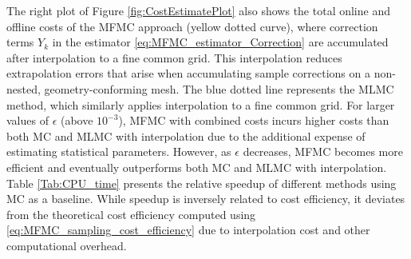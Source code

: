 The right plot of Figure \ref{fig:CostEstimatePlot} also shows the total online and offline costs of the MFMC approach (yellow dotted curve), where correction terms $Y_k$ in the estimator \eqref{eq:MFMC_estimator_Correction} are accumulated after interpolation to a fine common grid. This interpolation reduces extrapolation errors that arise when accumulating sample corrections on a non-nested, geometry-conforming mesh. The blue dotted line represents the MLMC method, which similarly applies interpolation to a fine common grid. For larger values of $\epsilon$ (above $10^{-3}$), MFMC with combined costs incurs higher costs than both MC and MLMC with interpolation due to the additional expense of estimating statistical parameters. However, as $\epsilon$ decreases, MFMC becomes more efficient and eventually outperforms both MC and MLMC with interpolation. Table \ref{Tab:CPU_time} presents the relative speedup of different methods using MC as a baseline. While speedup is inversely related to cost efficiency, it deviates from the theoretical cost efficiency computed using \eqref{eq:MFMC_sampling_cost_efficiency} due to interpolation cost and other computational overhead.


